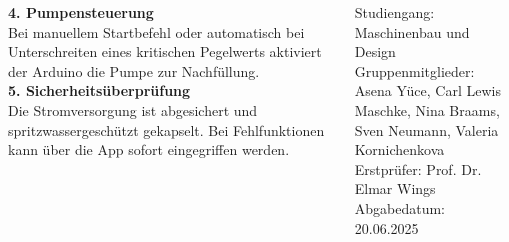 \documentclass[25pt,a0paper, portrait]{tikzposter}
\begin{document}
\begin{columns}
{{				\textbf{4. Pumpensteuerung} \\
				Bei manuellem Startbefehl oder automatisch bei Unterschreiten eines kritischen Pegelwerts aktiviert der Arduino die Pumpe zur Nachfüllung.\\[1em]
				
				\textbf{5. Sicherheitsüberprüfung} \\
				Die Stromversorgung ist abgesichert und spritzwassergeschützt gekapselt. Bei Fehlfunktionen kann über die App sofort eingegriffen werden.
			}
			
			{
				Studiengang: Maschinenbau und Design\\
				Gruppenmitglieder: Asena Yüce, Carl Lewis Maschke, Nina Braams, \\Sven Neumann, Valeria Kornichenkova\\
				Erstprüfer: Prof. Dr. Elmar Wings\\
				Abgabedatum: 20.06.2025
			}
			
		}
	\end{columns}
	

	
\end{document}
